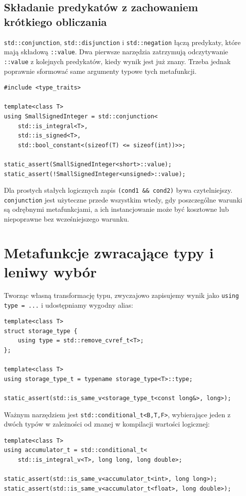\subsection{Składanie predykatów z zachowaniem krótkiego obliczania}

\texttt{std::conjunction}, \texttt{std::disjunction} i
\texttt{std::negation} łączą predykaty, które mają składową
\texttt{::value}. Dwa pierwsze narzędzia zatrzymują odczytywanie \texttt{::value}
z kolejnych predykatów, kiedy wynik jest już znany. Trzeba jednak
poprawnie sformować same argumenty typowe tych metafunkcji.

\begin{lstlisting}
#include <type_traits>

template<class T>
using SmallSignedInteger = std::conjunction<
    std::is_integral<T>,
    std::is_signed<T>,
    std::bool_constant<(sizeof(T) <= sizeof(int))>>;

static_assert(SmallSignedInteger<short>::value);
static_assert(!SmallSignedInteger<unsigned>::value);
\end{lstlisting}

Dla prostych stałych logicznych zapis
\texttt{(cond1 \&\& cond2)} bywa czytelniejszy.
\texttt{conjunction} jest użyteczne przede wszystkim wtedy, gdy
poszczególne warunki są odrębnymi metafunkcjami, a ich instancjowanie
może być kosztowne lub niepoprawne bez wcześniejszego warunku.

\section{Metafunkcje zwracające typy i leniwy wybór}
\label{sec:cpp9-transforms}

Tworząc własną transformację typu, zwyczajowo zapisujemy wynik jako
\texttt{using type = ...} i udostępniamy wygodny alias:

\begin{lstlisting}
template<class T>
struct storage_type {
    using type = std::remove_cvref_t<T>;
};

template<class T>
using storage_type_t = typename storage_type<T>::type;

static_assert(std::is_same_v<storage_type_t<const long&>, long>);
\end{lstlisting}

Ważnym narzędziem jest \texttt{std::conditional\_t<B,T,F>}, wybierające
jeden z dwóch typów w zależności od znanej w kompilacji wartości logicznej:

\begin{lstlisting}
template<class T>
using accumulator_t = std::conditional_t<
    std::is_integral_v<T>, long long, long double>;

static_assert(std::is_same_v<accumulator_t<int>, long long>);
static_assert(std::is_same_v<accumulator_t<float>, long double>);
\end{lstlisting}

